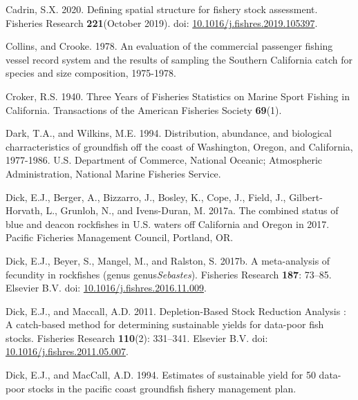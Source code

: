 \documentclass[
  english,
  a4paper,
]{article}
\newlength{\cslhangindent}
\newlength{\cslentryspacingunit} %
\newenvironment{CSLReferences}[2] %
 {%
  \setlength{\parindent}{0pt}
  \ifodd #1
  \let\oldpar\par
  \def\par{\hangindent=\cslhangindent\oldpar}
  \fi
  \setlength{\parskip}{#2\cslentryspacingunit}
 }%
 {}
\begin{document}
\begin{CSLReferences}{1}{0}
\leavevmode{}%
Cadrin, S.X. 2020. {Defining spatial structure for fishery stock assessment}. Fisheries Research \textbf{221}(October 2019). doi: \href{https://doi.org/10.1016/j.fishres.2019.105397}{10.1016/j.fishres.2019.105397}.

\leavevmode{}%
Collins, and Crooke. 1978. {An evaluation of the commercial passenger fishing vessel record system and the results of sampling the Southern California catch for species and size composition, 1975-1978.}

\leavevmode{}%
Croker, R.S. 1940. {Three Years of Fisheries Statistics on Marine Sport Fishing in California}. Transactions of the American Fisheries Society \textbf{69}(1).

\leavevmode{}%
Dark, T.A., and Wilkins, M.E. 1994. {Distribution, abundance, and biological charracteristics of groundfish off the coast of Washington, Oregon, and California, 1977-1986}. U.S. Department of Commerce, National Oceanic; Atmospheric Administration, National Marine Fisheries Service.

\leavevmode{}%
Dick, E.J., Berger, A., Bizzarro, J., Bosley, K., Cope, J., Field, J., Gilbert-Horvath, L., Grunloh, N., and Ivens-Duran, M. 2017a. {The combined status of blue and deacon rockfishes in U.S. waters off California and Oregon in 2017}. Pacific Ficheries Management Council, Portland, OR.

\leavevmode{}%
Dick, E.J., Beyer, S., Mangel, M., and Ralston, S. 2017b. {A meta-analysis of fecundity in rockfishes (genus genus\emph{Sebastes})}. Fisheries Research \textbf{187}: 73--85. Elsevier B.V. doi: \href{https://doi.org/10.1016/j.fishres.2016.11.009}{10.1016/j.fishres.2016.11.009}.

\leavevmode{}%
Dick, E.J., and Maccall, A.D. 2011. {Depletion-Based Stock Reduction Analysis : A catch-based method for determining sustainable yields for data-poor fish stocks}. Fisheries Research \textbf{110}(2): 331--341. Elsevier B.V. doi: \href{https://doi.org/10.1016/j.fishres.2011.05.007}{10.1016/j.fishres.2011.05.007}.

\leavevmode{}%
Dick, E.J., and MacCall, A.D. 1994. {Estimates of sustainable yield for 50 data-poor stocks in the pacific coast groundfish fishery management plan}.


\end{CSLReferences}
\end{document}

